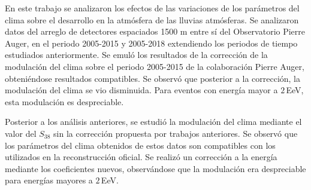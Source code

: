 


En este trabajo se analizaron los efectos de las variaciones de los parámetros del clima sobre el desarrollo en la atmósfera de las lluvias atmósferas. Se analizaron datos del arreglo de detectores espaciados 1500 m entre sí del Observatorio Pierre Auger, en el periodo 2005-2015 y 2005-2018 extendiendo los periodos de tiempo estudiados anteriormente. Se emuló los resultados de la corrección de la modulación del clima sobre el periodo 2005-2015 de la colaboración Pierre Auger, obteniéndose resultados compatibles. Se observó que posterior a la corrección, la modulación del clima se vio disminuida. Para eventos con energía mayor a $2\,$EeV, esta modulación es despreciable.

Posterior a los análisis anteriores, se estudió la modulación del clima mediante el valor del $S_{38}$ sin la corrección propuesta por trabajos anteriores. Se observó que los parámetros del clima obtenidos de estos datos son compatibles con los utilizados en la reconstrucción oficial. Se realizó un corrección a  la energía mediante los coeficientes nuevos, observándose que la modulación era despreciable para energías mayores a $2\,$EeV. 


